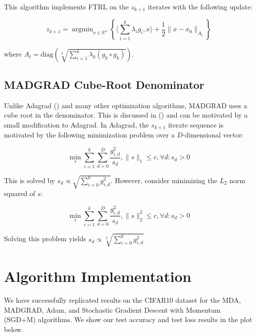 \documentclass{article}
\newcommand{\R}{\mathbb{R}}
\newcommand{\argmin}{\mathop{\text{argmin}}}
\newcommand{\diag}{\text{diag}}
\begin{document}
This algorithm implements FTRL on the $z_{k+1}$ iterates with the following update:

\[
  z_{k+1} = \argmin_{x \in \R^n}\left\{\langle \sum\limits_{i=1}^{k}\lambda_i g_i, x \rangle + \frac{1}{2}\|x
  - x_0\|_{A_t}\right\}
\]

where $A_t = \diag\left(\sqrt[3]{\sum_{i=1}^{k} \lambda_k (g_{k} \circ g_k)}\right)$.

\subsection{MADGRAD Cube-Root Denominator}

Unlike Adagrad (\cite{duchi_adaptive_nodate}) and many other optimization algorithms, MADGRAD uses a cube root in the
denominator. This is discussed in (\cite{defazio_adaptivity_nodate}) and can be motivated by a small modification to
Adagrad. In Adagrad, the $s_{k+1}$ iterate sequence is motivated by the following minimization problem over a
$D$-dimensional vector:

\[
  \min_{s} \sum\limits_{i=1}^k\sum\limits_{d=0}^D \frac{g_{i,d}^2}{s_{d}}, \|s\|_1 \leq c, \forall d: s_d > 0
\]

This is solved by $s_d \propto \sqrt{\sum_{i=0}^k g_{i,d}^2}$. However, consider minimizing the $L_2$ norm squared of
$s$:

\[
  \min_{s} \sum\limits_{i=1}^k\sum\limits_{d=0}^D \frac{g_{i,d}^2}{s_{d}}, \|s\|_{2}^2 \leq c, \forall d: s_d > 0
\]

Solving this problem yields $s_d \propto \sqrt[3]{\sum_{i=0}^k g_{i,d}^2}$

\section{Algorithm Implementation}

We have successfully replicated results on the CIFAR10 dataset for the MDA, MADGRAD, Adam, and Stochastic
Gradient Descent with Momentum (SGD+M) algorithms. We show our test accuracy and test loss results in the plot below.
\end{document}

